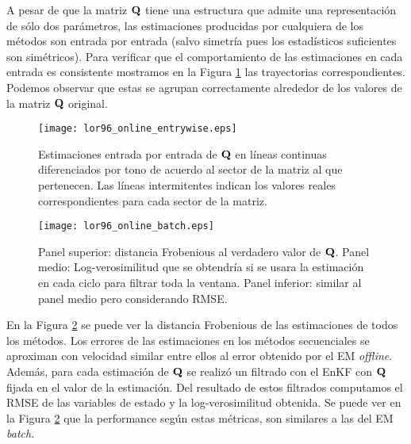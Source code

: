 A pesar de que la matriz $\mathbf{Q}$ tiene una estructura que admite una representación de sólo dos parámetros, las estimaciones producidas por cualquiera de los métodos son entrada por entrada (salvo simetría pues los estadísticos suficientes son simétricos). Para verificar que el comportamiento de las estimaciones en cada entrada es consistente mostramos en la Figura \ref{fig:lor96_online_entrywise} las trayectorias correspondientes. Podemos observar que estas se agrupan correctamente alrededor de los valores de la matriz $\mathbf{Q}$ original.
\begin{figure}[h]
    \centering
    \texttt{[image: lor96\_online\_entrywise.eps]}
    \caption{Estimaciones entrada por entrada de $\mathbf{Q}$ en líneas continuas diferenciados por tono de acuerdo al sector de la matriz al que pertenecen. Las líneas intermitentes indican los valores reales correspondientes para cada sector de la matriz.}
    \label{fig:lor96_online_entrywise}
\end{figure}
\begin{figure}[h]
    \centering
    \texttt{[image: lor96\_online\_batch.eps]}
    \caption{Panel superior: distancia Frobenious al verdadero valor de $\mathbf{Q}$. Panel medio: Log-verosimilitud que se obtendría si se usara la estimación en cada ciclo para filtrar toda la ventana. Panel inferior: similar al panel medio pero considerando RMSE.}
    \label{fig:lor96_online_batch}
\end{figure}
En la Figura \ref{fig:lor96_online_batch} se puede ver la distancia Frobenious de las estimaciones de todos los métodos. Los errores de las estimaciones en los métodos secuenciales se aproximan con velocidad similar entre ellos al error obtenido por el EM \textit{offline}. Además, para cada estimación de $\mathbf{Q}$ se realizó un filtrado con el EnKF con $\mathbf{Q}$ fijada en el valor de la estimación. Del resultado de estos filtrados computamos el RMSE de las variables de estado y la log-verosimilitud obtenida. Se puede ver en la Figura \ref{fig:lor96_online_batch} que la performance según estas métricas, son similares a las del EM \textit{batch}.

